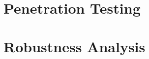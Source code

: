 \documentclass{article}
\begin{document}


\section{Penetration Testing}




\section{Robustness Analysis}
\end{document}
